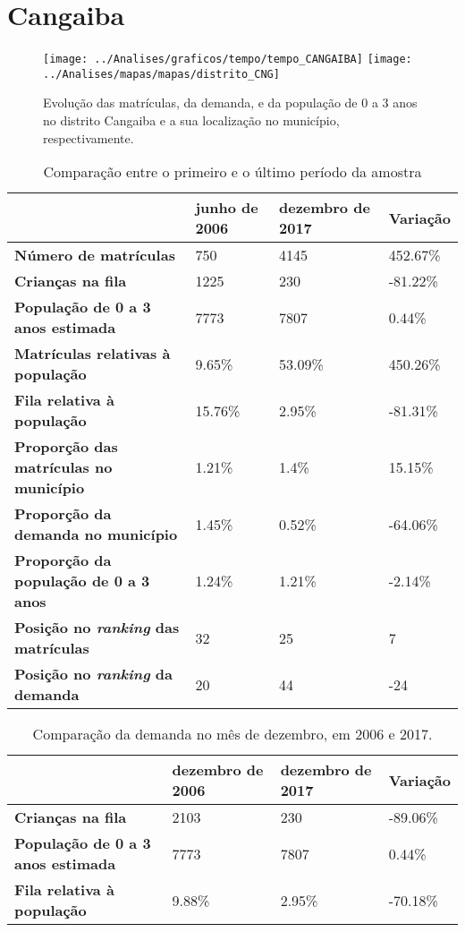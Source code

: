 \section{Cangaiba}
\begin{figure}[H]
\centering
\texttt{[image: ../Analises/graficos/tempo/tempo\_CANGAIBA]}
\texttt{[image: ../Analises/mapas/mapas/distrito\_CNG]}
\caption{Evolução das matrículas, da demanda, e da população de 0 a 3 anos no distrito Cangaiba e a sua localização no município, respectivamente.}
\end{figure}
\begin{table}[H]
\begin{tabular}{l|l|l|l}
\textbf{}                                      & \textbf{junho de 2006}       & \textbf{dezembro de 2017}    & \textbf{Variação} \\ \hline
\textbf{Número de matrículas}                  & 750 & 4145 & 452.67\% \\ \hline
\textbf{Crianças na fila}                      & 1225 & 230 & -81.22\% \\ \hline
\textbf{População de 0 a 3 anos estimada}      & 7773 & 7807 & 0.44\% \\ \hline
\textbf{Matrículas relativas à população}      & 9.65\% & 53.09\% & 450.26\% \\ \hline
\textbf{Fila relativa à população}             & 15.76\% & 2.95\% & -81.31\% \\ \hline
\textbf{Proporção das matrículas no município} & 1.21\% & 1.4\% & 15.15\% \\ \hline
\textbf{Proporção da demanda no município}     & 1.45\% & 0.52\% & -64.06\% \\ \hline
\textbf{Proporção da população de 0 a 3 anos}  & 1.24\% & 1.21\% & -2.14\% \\ \hline
\textbf{Posição no \textit{ranking} das matrículas}     & 32 & 25 & 7 \\ \hline
\textbf{Posição no \textit{ranking} da demanda}         & 20 & 44 & -24 \\ 
\end{tabular}
\caption{Comparação entre o primeiro e o último período da amostra}
\end{table}
\begin{table}[H]
\begin{tabular}{l|l|l|l}
\textbf{}                                 & \textbf{dezembro de 2006} & \textbf{dezembro de 2017} & \textbf{Variação} \\ \hline
\textbf{Crianças na fila}                      & 2103 & 230 & -89.06\% \\ \hline
\textbf{População de 0 a 3 anos estimada}      & 7773 & 7807 & 0.44\% \\ \hline
\textbf{Fila relativa à população}             & 9.88\% & 2.95\% & -70.18\% \\
\end{tabular}
\caption{Comparação da demanda no mês de dezembro, em 2006 e 2017.}
\end{table}
